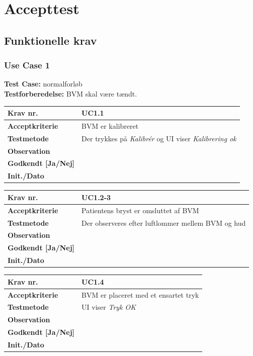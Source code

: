 		\section{Accepttest}

		
\subsection{Funktionelle krav}

\subsubsection{Use Case 1}
\textbf{Test Case:} normalforløb \\
\textbf{Testforberedelse:} BVM skal være tændt. \\

\begin{tabularx}{1\textwidth}{|l|X|}
\hline
\textbf{Krav nr.}              & UC1.1  \\ \hline
\textbf{Acceptkriterie}        & BVM er kalibreret \\ \hline
\textbf{Testmetode}            & Der trykkes på \textit{Kalibrér} og UI viser \textit{Kalibrering ok} \\ \hline
\textbf{Observation}           &  \\ \hline
\textbf{Godkendt {[}Ja/Nej{]}} &  \\ \hline
\textbf{Init./Dato}            &  \\ \hline
\end{tabularx}
				


\begin{tabularx}{1\textwidth}{|l|X|}
\hline
\textbf{Krav nr.}              & UC1.2-3  \\ \hline
\textbf{Acceptkriterie}        & Patientens bryst er omsluttet af BVM \\ \hline
\textbf{Testmetode}            & Der observeres efter luftlommer mellem BVM og hud \\ \hline
\textbf{Observation}           &  \\ \hline
\textbf{Godkendt {[}Ja/Nej{]}} &  \\ \hline
\textbf{Init./Dato}            &  \\ \hline
\end{tabularx}
		

\begin{tabularx}{1\textwidth}{|l|X|}
\hline
\textbf{Krav nr.}              & UC1.4  \\ \hline
\textbf{Acceptkriterie}        & BVM er placeret med et ensartet tryk \\ \hline
\textbf{Testmetode}            & UI viser \textit{Tryk OK} \\ \hline
\textbf{Observation}           &  \\ \hline
\textbf{Godkendt {[}Ja/Nej{]}} &  \\ \hline
\textbf{Init./Dato}            &  \\ \hline
\end{tabularx}
		
